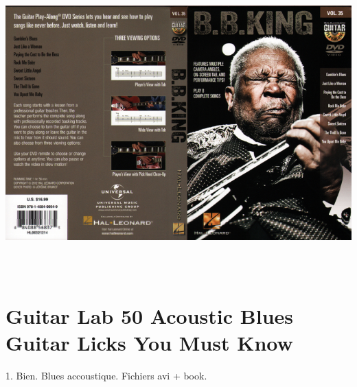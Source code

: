 \documentclass[a4paper]{book}
\begin{document}
\begin{center}
\includegraphics[width=17cm,height=11.538cm]{lebluessupportsmethodes-img72.jpg}
\end{center}







\clearpage\section[Guitar Lab 50 Acoustic Blues Guitar Licks You Must
Know]{Guitar Lab 50 Acoustic Blues Guitar Licks You Must Know}
\hypertarget{RefHeadingToc140973218262}{}1. Bien. Blues accoustique.
Fichiers avi + book.
\end{document}

